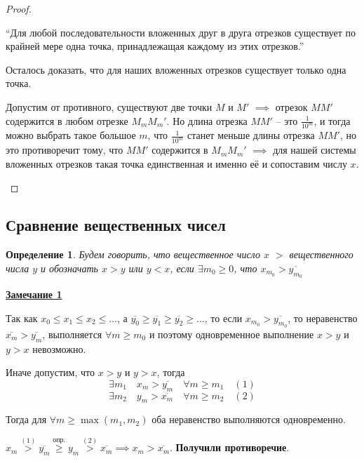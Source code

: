 \documentclass{article}
\newcommand{\parspace}{\vspace{10pt}}
\theoremstyle{break}
\newtheorem{definition}{Определение}[subsection]
\begin{document}
\begin{proof}
\begin{enumerate}
            ``Для любой последовательности вложенных друг в друга отрезков существует
            по крайней мере одна точка, принадлежащая каждому из этих отрезков.''
            
            Осталось доказать, что для наших вложенных отрезков существует только одна точка.
            
            Допустим от противного, существуют две точки $M$ и $M'$ $\implies$ отрезок
            $MM'$ содержится в любом отрезке $M_mM_m'$. Но длина отрезка $MM'$ -- это
            $\frac{1}{10^m}$, и тогда можно выбрать такое большое $m$, что $\frac{1}{10^m}$
            станет меньше длины отрезка $MM'$, но это противоречит тому, что $MM'$ содержится в
            $M_mM_m'$ $\implies$ для нашей системы вложенных отрезков такая точка единственная и
            именно её и сопоставим числу $x$.
    \end{enumerate}
\end{proof}

\subsection{Сравнение вещественных чисел}

\begin{definition}
    Будем говорить, что вещественное число $x$ $>$ вещественного числа $y$ и обозначать
    $x > y$ или $y < x$, если $\exists m_0 \ge 0$, что $x_{m_0} > \overline{y_{m_0}}$
\end{definition}

\underline{\textbf{Замечание 1}}

Так как $x_0 \le x_1 \le x_2 \le \dots$, 
а $\overline{y_0} \ge \overline{y_1} \ge \overline{y_2} \ge \dots$,
то если $x_{m_0} > \overline{y_{m_0}}$, то неравенство $\overline{x_m} > \overline{y_m}$,
выполняется $\forall m \ge m_0$ и поэтому одновременное выполнение
$x > y$ и $y > x$ невозможно.

Иначе допустим, что $x > y$ и $y > x$, тогда
\[\exists m_1 \quad x_m > \overline{y_m} \quad \forall m \ge m_1 \quad (1)\]
\[\exists m_2 \quad y_m > \overline{x_m} \quad \forall m \ge m_2 \quad (2)\]

Тогда для $\forall m \ge \max (m_1, m_2)$ оба неравенство выполняются одновременно.

$x_m \stackrel{(1)}{>} \overline{y_m}
\stackrel{\text{опр.}}{\ge} y_m 
\stackrel{(2)}{>} \overline{x_m} \implies x_m > \overline{x_m}$.
\textbf{Получили противоречие}.

\parspace
\end{document}

